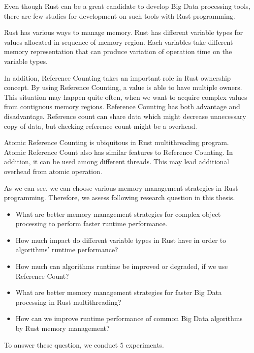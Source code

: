 
Even though Rust can be a great candidate to develop Big Data processing tools, there are few studies for development on such tools with Rust programming. 

Rust has various ways to manage memory. Rust has different variable types for values allocated in sequence of memory region. 
Each variables take different memory representation that can produce variation of operation time on the variable types.

In addition, Reference Counting takes an important role in Rust ownership concept. By using Reference Counting, a value is able to have multiple owners.
This situation may happen quite often, when we want to acquire complex values from contiguous memory regions. 
Reference Counting has both advantage and disadvantage. 
Reference count can share data which might decrease unnecessary copy of data, but checking reference count might be a overhead. 

Atomic Reference Counting is ubiquitous in Rust multithreading program. Atomic Reference Count also has similar features to Reference Counting. 
In addition, it can be used among different threads. This may lead additional overhead from atomic operation.

As we can see, we can choose various memory management strategies in Rust programming.
Therefore, we assess following research question in this thesis.
\begin{itemize}
    \item What are better memory management strategies for complex object processing to perform faster runtime performance.
    \item How much impact do different variable types in Rust have in order to algorithms' runtime performance?
    \item How much can algorithms runtime be improved or degraded, if we use Reference Count?
    \item What are better memory management strategies for faster Big Data processing in Rust multithreading?
    \item How can we improve runtime performance of common Big Data algorithms by Rust memory management?
\end{itemize}

To answer these question, we conduct 5 experiments. 



